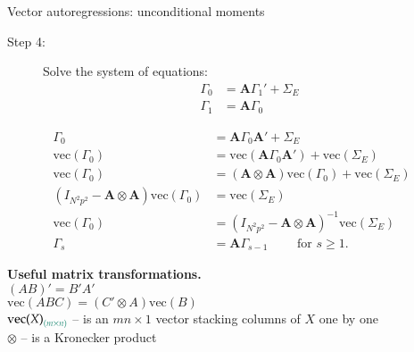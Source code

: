 \documentclass[notes,blackandwhite,mathsans,usenames,dvipsnames]{beamer}
\begin{document}
\begin{frame}{Vector autoregressions: unconditional moments }
\small
\begin{description}
\item[Step 4:] {\color{mcxs1}Solve} {\color{mcxs2}the system of equations}:
\begin{align*}
\Gamma_0 &= \mathbf{A}\Gamma_1' + \Sigma_E\\
\Gamma_1 &= \mathbf{A}\Gamma_0
\end{align*}
\end{description}
\begin{align*}
\Gamma_0 &= \mathbf{A}\Gamma_0\mathbf{A}' + \Sigma_E\\
\text{vec}(\Gamma_0) &= \text{vec}(\mathbf{A}\Gamma_0\mathbf{A}') + \text{vec}(\Sigma_E)\\
\text{vec}(\Gamma_0) &= (\mathbf{A}\otimes\mathbf{A})\text{vec}(\Gamma_0) + \text{vec}(\Sigma_E)\\
(I_{N^2p^2} - \mathbf{A}\otimes\mathbf{A})\text{vec}(\Gamma_0) &= \text{vec}(\Sigma_E)\\
\text{vec}(\Gamma_0) &= (I_{N^2p^2} - \mathbf{A}\otimes\mathbf{A})^{-1}\text{vec}(\Sigma_E)\\[1ex]
\Gamma_s &= \mathbf{A}\Gamma_{s-1} \qquad\text{ for }s\geq1.
\end{align*}

\textbf{Useful matrix transformations.}\\
$(AB)' = B'A' $\\
$\text{vec}(ABC) = (C'\otimes A)\text{vec}(B)$\\
$\text{vec}{(X)}_{\color{mcxs2}(m\times n)}$ {\color{mcxs2}-- is an} $mn\times1$ {\color{mcxs2}vector stacking columns of} $X$ {\color{mcxs2}one by one}\\
$\otimes$ {\color{mcxs2}-- is a Kronecker product}

\end{frame}
\end{document}

